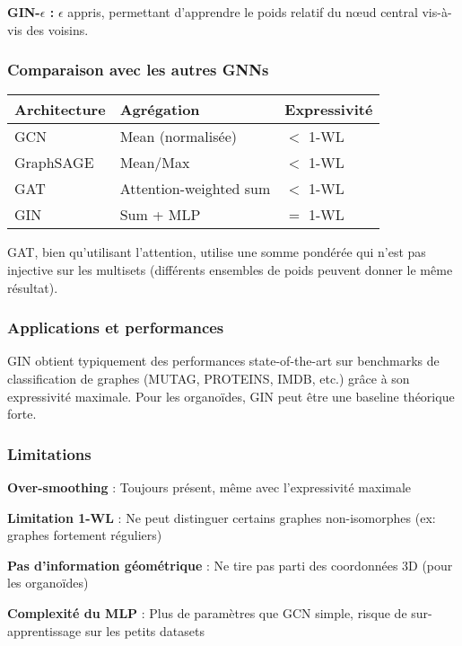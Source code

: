 \textbf{GIN-$\epsilon$ :} $\epsilon$ appris, permettant d'apprendre le poids relatif du nœud central vis-à-vis des voisins.

\subsubsection{Comparaison avec les autres GNNs}

\begin{table}[h]
\centering
\begin{tabular}{lll}
\hline
\textbf{Architecture} & \textbf{Agrégation} & \textbf{Expressivité} \\
\hline
GCN & Mean (normalisée) & $<$ 1-WL \\
GraphSAGE & Mean/Max & $<$ 1-WL \\
GAT & Attention-weighted sum & $<$ 1-WL \\
GIN & Sum + MLP & $=$ 1-WL \\
\hline
\end{tabular}
\end{table}

GAT, bien qu'utilisant l'attention, utilise une somme pondérée qui n'est pas injective sur les multisets (différents ensembles de poids peuvent donner le même résultat).

\subsubsection{Applications et performances}

GIN obtient typiquement des performances state-of-the-art sur benchmarks de classification de graphes (MUTAG, PROTEINS, IMDB, etc.) grâce à son expressivité maximale. Pour les organoïdes, GIN peut être une baseline théorique forte.

\subsubsection{Limitations}

\textbf{Over-smoothing} : Toujours présent, même avec l'expressivité maximale

\textbf{Limitation 1-WL} : Ne peut distinguer certains graphes non-isomorphes (ex: graphes fortement réguliers)

\textbf{Pas d'information géométrique} : Ne tire pas parti des coordonnées 3D (pour les organoïdes)

\textbf{Complexité du MLP} : Plus de paramètres que GCN simple, risque de sur-apprentissage sur les petits datasets

